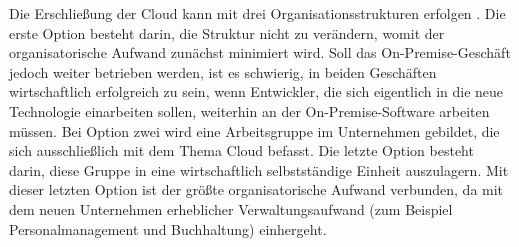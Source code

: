 Die Erschließung der Cloud kann mit drei Organisationsstrukturen erfolgen 
. Die erste Option besteht darin, 
die Struktur nicht zu verändern, womit der organisatorische Aufwand zunächst 
minimiert wird. Soll das On-Premise-Geschäft jedoch weiter betrieben werden, 
ist es schwierig, in beiden Geschäften wirtschaftlich erfolgreich zu sein, 
wenn Entwickler, die sich eigentlich in 
die neue Technologie einarbeiten sollen, weiterhin an der On-Premise-Software 
arbeiten müssen. Bei Option zwei wird eine Arbeitsgruppe im Unternehmen gebildet, die 
sich ausschließlich mit dem Thema Cloud befasst. Die 
letzte Option besteht darin, diese Gruppe in eine wirtschaftlich selbstständige 
Einheit auszulagern. Mit dieser letzten Option ist der größte organisatorische 
Aufwand verbunden, da mit dem neuen Unternehmen erheblicher Verwaltungsaufwand 
(zum Beispiel Personalmanagement und Buchhaltung) einhergeht.

